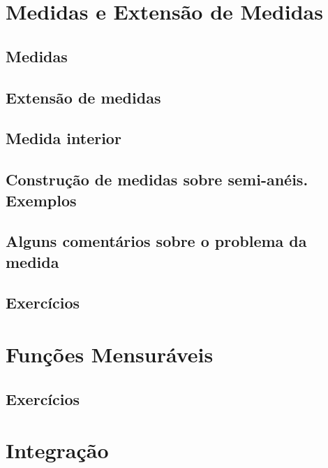 \documentclass[
]{book}
\begin{document}
\chapter{Medidas e Extensão de Medidas}\label{medidas-e-extensuxe3o-de-medidas}

\section{Medidas}\label{medidas}

\section{Extensão de medidas}\label{extensuxe3o-de-medidas}

\section{Medida interior}\label{medida-interior}

\section{Construção de medidas sobre semi-anéis. Exemplos}\label{construuxe7uxe3o-de-medidas-sobre-semi-anuxe9is.-exemplos}

\section{Alguns comentários sobre o problema da medida}\label{alguns-comentuxe1rios-sobre-o-problema-da-medida}

\section*{Exercícios}\label{exercuxedcios-2}

\chapter{Funções Mensuráveis}\label{funuxe7uxf5es-mensuruxe1veis}

\section*{Exercícios}\label{exercuxedcios-3}

\chapter{Integração}\label{integrauxe7uxe3o}
\end{document}
